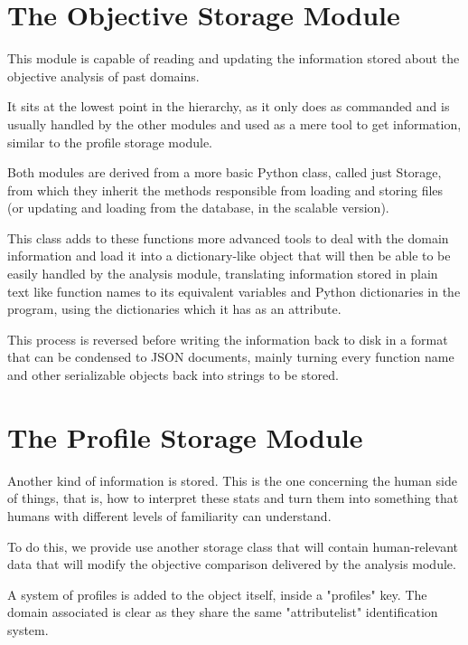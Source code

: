 \section{The Objective Storage Module}
\label{cap3:sec:objjson}

This module is capable of reading and updating the information stored about the objective analysis of past domains.

It sits at the lowest point in the hierarchy, as it only does as commanded and is usually handled by the other modules and used as a mere tool to get information, similar to the profile storage module.

Both modules are derived from a more basic Python class, called just Storage, from which they inherit the methods responsible from loading and storing files (or updating and loading from the database, in the scalable version).

This class adds to these functions more advanced tools to deal with the domain information and load it into a dictionary-like object that will then be able to be easily handled by the analysis module, translating information stored in plain text like function names to its equivalent variables and Python dictionaries in the program, using the dictionaries which it has as an attribute.

This process is reversed before writing the information back to disk in a format that can be condensed to JSON documents, mainly turning every function name and other serializable objects back into strings to be stored.

\section{The Profile Storage Module}
\label{cap3:sec:profilestorage}

Another kind of information is stored. This is the one concerning the human side of things, that is, how to interpret these stats and turn them into something that humans with different levels of familiarity can understand.

To do this, we provide use another storage class that will contain human-relevant data that will modify the objective comparison delivered by the analysis module.

A system of profiles is added to the object itself, inside a "profiles" key. The domain associated is clear as they share the same "attributelist" identification system.

